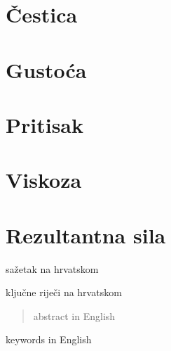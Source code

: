 \documentclass[diplomskirad]{fer}
\begin{document}
    \section{Čestica}\label{sec:cestica}


    \section{Gustoća}\label{sec:gustoca}


    \section{Pritisak}\label{sec:pritisak}


    \section{Viskoza}\label{sec:viskoza}


    \section{Rezultantna sila}\label{sec:rezultantna-sila}


    
    \begin{sazetak}
        sažetak na hrvatskom
    \end{sazetak}
    \begin{kljucnerijeci}
        ključne riječi na hrvatskom
    \end{kljucnerijeci}
    \begin{abstract}
        abstract in English
    \end{abstract}
    \begin{keywords}
        keywords in English
    \end{keywords}
\end{document}
